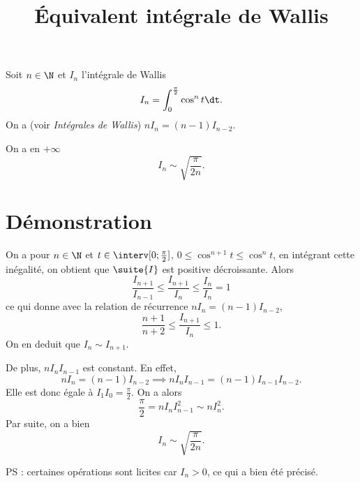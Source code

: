 \documentclass[fontsize=12pt,twoside=false,parskip=half, french]{scrartcl}
\title{Équivalent intégrale de Wallis}
\date{}
\author{}
\begin{document}
\maketitle
   Soit $n \in \N$ et $I_n$ l’intégrale de Wallis
   \[
      I_n = \int_0^{\frac{\pi}{2}} \cos^n t \dt.
   \]
   On a (voir \emph{Intégrales de Wallis}) $nI_n = (n - 1)I_{n - 2}$.
   \begin{Theoreme}
      On a en $+\infty$
      \[
         I_n \sim \sqrt{\frac{\pi}{2n}}.
      \]
   \end{Theoreme}
   \section{Démonstration}
      On a pour $n \in \N$ et $t \in \interv[0; \frac{\pi}{2}]$,
      $0 \leq \cos^{n + 1} t \leq \cos^{n} t$, en intégrant cette inégalité,
      on obtient que $\suite{I}$ est positive décroissante. Alors
      \[
         \frac{I_{n + 1}}{I_{n - 1}} \leq \frac{I_{n + 1}}{I_n} \leq \frac{I_n}{I_n} = 1
      \]
      ce qui donne avec la relation de récurrence $nI_n = (n - 1)I_{n - 2}$,
      \[
         \frac{n + 1}{n + 2} \leq \frac{I_{n + 1}}{I_n} \leq 1.
      \]
      On en deduit que $I_n \sim I_{n + 1}$.

      De plus, $nI_nI_{n - 1}$ est constant. En effet,
      \[
         nI_n = (n - 1)I_{n - 2} \implies nI_nI_{n - 1} = (n - 1)I_{n - 1}I_{n - 2}.
      \]
      Elle est donc égale à $I_1I_0 = \frac{\pi}{2}$. On a alors
      \[
         \frac{\pi}{2} = nI_nI_{n - 1}^2 \sim nI_n^2.
      \]
      Par suite, on a bien
      \[
         I_n \sim \sqrt{\frac{\pi}{2n}}.
      \]

      PS : certaines opérations sont licites car $I_n > 0$, ce qui a bien été précisé.
\end{document}
